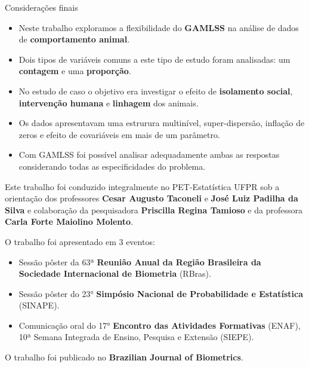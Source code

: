 \documentclass[
  ignorenonframetext,
  serif,
  professionalfont,
  usenames,
  dvipsnames,
  aspectratio = 169]{beamer}
\begin{document}
\begin{frame}{Considerações finais}
\protect\hypertarget{considerauxe7uxf5es-finais-1}{}
\begin{itemize}
\item
  Neste trabalho exploramos a flexibilidade do \textbf{GAMLSS} na
  análise de dados de \textbf{comportamento animal}.
\item
  Dois tipos de variáveis comuns a este tipo de estudo foram analisadas:
  um \textbf{contagem} e uma \textbf{proporção}.
\item
  No estudo de caso o objetivo era investigar o efeito de
  \textbf{isolamento social}, \textbf{intervenção humana} e
  \textbf{linhagem} dos animais.
\item
  Os dados apresentavam uma estrurura multinível, super-dispersão,
  inflação de zeros e efeito de covariáveis em mais de um parâmetro.
\item
  Com GAMLSS foi possível analisar adequadamente ambas as respostas
  considerando todas as especificidades do problema.
\end{itemize}
\end{frame}

\begin{frame}{}
\protect\hypertarget{section-2}{}
Este trabalho foi conduzido integralmente no PET-Estatística UFPR sob a
orientação dos professores \textbf{Cesar Augusto Taconeli} e
\textbf{José Luiz Padilha da Silva} e colaboração da pesquisadora
\textbf{Priscilla Regina Tamioso} e da professora
\textbf{Carla Forte Maiolino Molento}.
\end{frame}

\begin{frame}{}
\protect\hypertarget{section-3}{}
O trabalho foi apresentado em 3 eventos:

\begin{itemize}
\item
  Sessão pôster da 63ª
  \textbf{Reunião Anual da Região Brasileira da Sociedade Internacional de Biometria}
  (RBras).
\item
  Sessão pôster do 23°
  \textbf{Simpósio Nacional de Probabilidade e Estatística} (SINAPE).
\item
  Comunicação oral do 17° \textbf{Encontro das Atividades Formativas}
  (ENAF), 10ª Semana Integrada de Ensino, Pesquisa e Extensão (SIEPE).
\end{itemize}

O trabalho foi publicado no \textbf{Brazilian Journal of Biometrics}.
\end{frame}
\end{document}
